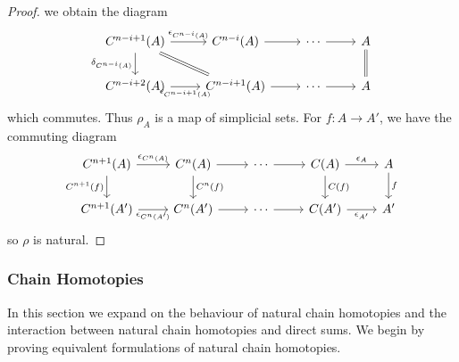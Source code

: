 \begin{proof}
    we obtain the diagram 
    \[\begin{tikzcd}
        {C^{n-i+1}(A)} & {C^{n-i}(A)} & \cdots & A \\
        {C^{n-i+2}(A)} & {C^{n-i+1}(A)} & \cdots & A
        \arrow["{\delta_{C^{n-i}(A)}}"', from=1-1, to=2-1]
        \arrow["{\epsilon_{C^{n-i+1}(A)}}"', from=2-1, to=2-2]
        \arrow["{\epsilon_{C^{n-i}(A)}}", from=1-1, to=1-2]
        \arrow[from=1-2, to=1-3]
        \arrow[from=2-2, to=2-3]
        \arrow[from=2-3, to=2-4]
        \arrow[from=1-3, to=1-4]
        \arrow[Rightarrow, no head, from=1-4, to=2-4]
        \arrow[Rightarrow, no head, from=1-1, to=2-2]
    \end{tikzcd}\]
    which commutes. Thus $\rho_A$ is a map of simplicial sets. For $f:A\to A'$, we have the commuting diagram
    \[\begin{tikzcd}
        {C^{n+1}(A)} & {C^n(A)} & \cdots & {C(A)} & A \\
        {C^{n+1}(A')} & {C^n(A')} & \cdots & {C(A')} & {A'}
        \arrow["{\epsilon_{C^n(A)}}", from=1-1, to=1-2]
        \arrow[from=1-2, to=1-3]
        \arrow[from=1-3, to=1-4]
        \arrow["{\epsilon_A}", from=1-4, to=1-5]
        \arrow["{\epsilon_{A'}}"', from=2-4, to=2-5]
        \arrow[from=2-3, to=2-4]
        \arrow[from=2-2, to=2-3]
        \arrow["{\epsilon_{C^n(A')}}"', from=2-1, to=2-2]
        \arrow["{C^{n+1}(f)}"', from=1-1, to=2-1]
        \arrow["{C^n(f)}", from=1-2, to=2-2]
        \arrow["{C(f)}", from=1-4, to=2-4]
        \arrow["f", from=1-5, to=2-5]
    \end{tikzcd}\]
    so $\rho$ is natural.
\end{proof}



\subsubsection{Chain Homotopies}\label{subsec:chainHomotop}


In this section we expand on the behaviour of natural chain homotopies and the interaction between natural chain homotopies and direct sums. We begin by proving equivalent formulations of natural chain homotopies.

